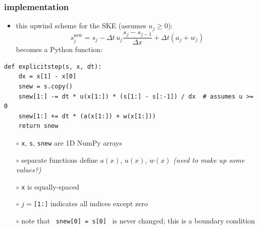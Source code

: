 \documentclass[10pt,dvipsnames]{beamer}
\newcommand{\snew}{s^{\text{new}}}
\newcommand{\comm}[1]{{\footnotesize \hfill \emph{#1}}}
\begin{document}
\begin{frame}[fragile]\frametitle{implementation}

\begin{itemize}
\item this upwind scheme for the SKE (assumes $u_j \ge 0$):
    $$\snew_j = s_j - \Delta t\, u_j \frac{s_j-s_{j-1}}{\Delta x} + \Delta t (a_j + w_j)$$
becomes a Python function:
\end{itemize}
\begin{lstlisting}[language=PythonPlus]
def explicitstep(s, x, dt):
    dx = x[1] - x[0]
    snew = s.copy()
    snew[1:] -= dt * u(x[1:]) * (s[1:] - s[:-1]) / dx  # assumes u >= 0
    snew[1:] += dt * (a(x[1:]) + w(x[1:]))
    return snew
\end{lstlisting}

\vspace{-2mm}
{\footnotesize
    \begin{itemize}
    \item[$\circ$] \texttt{x}, \texttt{s}, \texttt{snew} are 1D NumPy arrays
    \item[$\circ$] separate functions define $a(x)$, $u(x)$, $w(x)$ \comm{(need to make up some values?)}
    \item[$\circ$] \texttt{x} is equally-spaced
    \item[$\circ$] $j=$\texttt{[1:]} indicates all indices except zero
    \item[$\circ$] note that \, \texttt{snew[0] = s[0]} \, is never changed; this is a boundary condition
    \end{itemize}
}
\end{frame}
\end{document}
